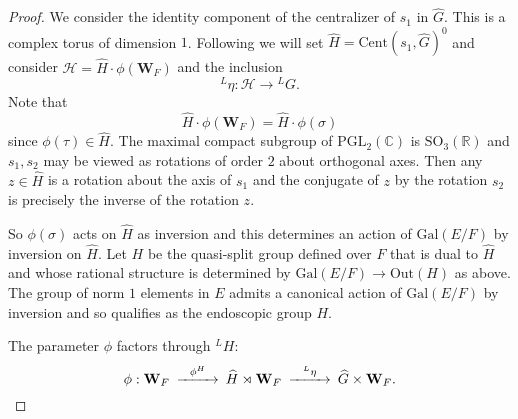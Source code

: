 \documentclass[11pt]{amsart}
\numberwithin{equation}{section}
\def\fe{\mathfrak{e}}
\def\Gal{\mathrm{Gal}}
\def\SO{\mathrm{SO}}
\def\PGL{\mathrm{PGL}}
\def\bW{\mathbf{W}}
\def\R{\mathbb{R}}
\def\C{\mathbb{C}}
\def\n{\mathbf{n}}
\def\W{\mathbf{W}}
\newcommand{\<}{\left\langle}
\renewcommand{\>}{\right\rangle}
\begin{document}
      \begin{proof} We consider the identity component  of the centralizer of $s_1$ in $\widehat{G}$.   This is a 
      complex torus of dimension $1$.    Following \cite[\S6.2]{T} we will set 
      $\widehat{H} = \mathrm{Cent}(s_1, \widehat{G})^0$ and consider $\mathcal{H} = \widehat{H} \cdot \phi(\bW_F)$ and the inclusion
      \[
    {}^L\eta :  \mathcal{H} \to {}^LG.
      \]    
  Note that 
  \[
  \widehat{H}\cdot \phi(\bW_F) = \widehat{H} \cdot \phi(\sigma)
  \]
  since $\phi(\tau) \in \widehat{H}$.   The maximal compact subgroup of $\PGL_2(\C)$ is $\SO_3(\R)$ and $s_1, s_2$ 
  may be viewed as rotations of order $2$ about orthogonal axes.   Then any $z \in \widehat{H}$ is a  rotation about the axis of $s_1$ and the conjugate of $z$ by the rotation $s_2$ is precisely the inverse of the rotation $z$.   
  
  
 So  $\phi(\sigma)$ acts on $\widehat{H}$ as inversion and this  determines an action of $\Gal(E/F)$ by inversion on $\widehat{H}$.   
  Let $H$ be the quasi-split group
defined over $F$ that is dual to $\widehat{H}$  and whose rational structure is determined
by $\Gal(E/F) \to  \mathrm{Out}(H)$ as above.  
The  group of norm $1$ elements in $E$ admits a canonical action of $\Gal(E/F)$ by inversion and so qualifies as the endoscopic group $H$.    

The parameter $\phi$ factors through ${}^LH$:
    \[
  \begin{CD}
 \phi :  \bW_F @> \phi^H >> \widehat{H}  \rtimes \bW_F    @> {}^L\eta >> \widehat{G} \times \W_F.
  \end{CD}
  \]
  

\end{proof}
\end{document}
